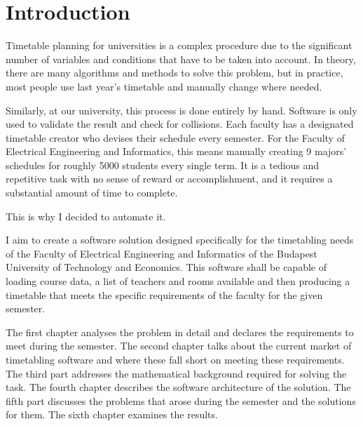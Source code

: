 \chapter*{Introduction}

Timetable planning for universities is a complex procedure due to the significant number of variables and conditions that have to be taken into account. In theory, there are many algorithms and methods to solve this problem, but in practice, most people use last year's timetable and manually change where needed.

Similarly, at our university, this process is done entirely by hand. Software is only used to validate the result and check for collisions. Each faculty has a designated timetable creator who devises their schedule every semester. For the Faculty of Electrical Engineering and Informatics, this means manually creating 9 majors' schedules for roughly 5000 students every single term. It is a tedious and repetitive task with no sense of reward or accomplishment, and it requires a substantial amount of time to complete.

This is why I decided to automate it.

I aim to create a software solution designed specifically for the timetabling needs of the Faculty of Electrical Engineering and Informatics of the Budapest University of Technology and Economics. This software shall be capable of loading course data, 
a list of teachers and rooms available and then producing a timetable that meets the specific requirements of the faculty for the given semester.

The first chapter analyses the problem in detail and declares the requirements to meet during the semester. The second chapter talks about the current market of timetabling software and where these fall short on meeting these requirements. The third part addresses the mathematical background required for solving the task. The fourth chapter describes the software architecture of the solution. The fifth part discusses the problems that arose during the semester and the solutions for them. The sixth chapter examines the results.
